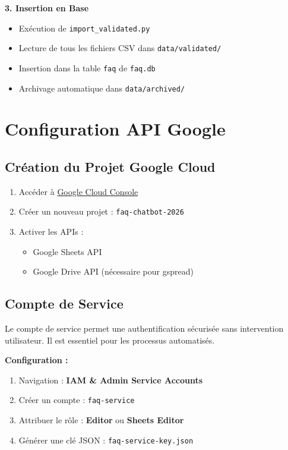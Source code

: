 \documentclass[11pt,a4paper]{article}
\begin{document}
\textbf{3. Insertion en Base}
\begin{itemize}
    \item Exécution de \texttt{import\_validated.py}
    \item Lecture de tous les fichiers CSV dans \texttt{data/validated/}
    \item Insertion dans la table \texttt{faq} de \texttt{faq.db}
    \item Archivage automatique dans \texttt{data/archived/}
\end{itemize}

\section{Configuration API Google}
\label{sec:google-api}

\subsection{Création du Projet Google Cloud}
\begin{enumerate}
    \item Accéder à \href{https://console.cloud.google.com}{Google Cloud Console}
    \item Créer un nouveau projet : \texttt{faq-chatbot-2026}
    \item Activer les APIs :
    \begin{itemize}
        \item Google Sheets API
        \item Google Drive API (nécessaire pour gspread)
    \end{itemize}
\end{enumerate}

\subsection{Compte de Service}
\begin{info}
Le compte de service permet une authentification sécurisée sans intervention utilisateur. Il est essentiel pour les processus automatisés.
\end{info}

\textbf{Configuration :}
\begin{enumerate}
    \item Navigation : \textbf{IAM \& Admin \to Service Accounts}
    \item Créer un compte : \texttt{faq-service}
    \item Attribuer le rôle : \textbf{Editor} ou \textbf{Sheets Editor}
    \item Générer une clé JSON : \texttt{faq-service-key.json}
\end{enumerate}
\end{document}
